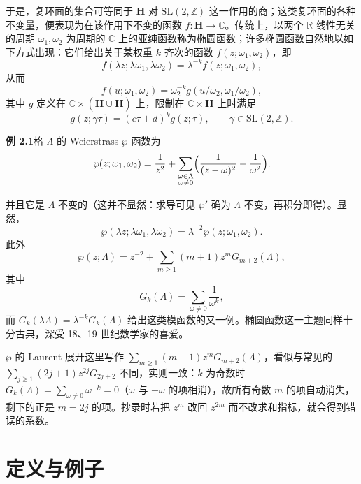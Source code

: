 于是，复环面的集合可等同于 $\mathbf{H}$ 对 $\mathrm{SL}(2,\mathbb{Z})$ 这一作用的商；这类复环面的各种不变量，便表现为在该作用下不变的函数 $f\colon\mathbf{H}\to\mathbb{C}$。传统上，以两个 $\mathbb{R}$ 线性无关的周期 $\omega_{1},\omega_{2}$ 为周期的 $\mathbb{C}$ 上的亚纯函数称为椭圆函数；许多椭圆函数自然地以如下方式出现：它们给出关于某权重 $k$ 齐次的函数 $f(z;\omega_{1},\omega_{2})$，即
\[
f(\lambda z;\lambda\omega_{1},\lambda\omega_{2})=\lambda^{-k}f(z;\omega_{1},\omega_{2}),
\]
从而
\[
f(u;\omega_{1},\omega_{2})=\omega_{2}^{-k}g(u/\omega_{2},\omega_{1}/\omega_{2}),
\]
其中 $g$ 定义在 $\mathbb{C}\times(\mathbf{H}\cup\overline{\mathbf{H}})$ 上，限制在 $\mathbb{C}\times\mathbf{H}$ 上时满足
\[
g(z;\gamma\tau)=(c\tau+d)^{k}g(z;\tau),\qquad\gamma\in\mathrm{SL}(2,\mathbb{Z}).
\]

\par\medskip\noindent\textbf{例 2.1}\quad 格 $\Lambda$ 的 Weierstrass $\wp$ 函数为
\[
\wp(z;\omega_{1},\omega_{2})=\frac{1}{z^{2}}+\sum_{\substack{\omega\in\Lambda\\ \omega\ne0}}\Bigl(\frac{1}{(z-\omega)^{2}}-\frac{1}{\omega^{2}}\Bigr).
\]

并且它是 $\Lambda$ 不变的（这并不显然：求导可见 $\wp'$ 确为 $\Lambda$ 不变，再积分即得）。显然，
\[
\wp(\lambda z;\lambda\omega_{1},\lambda\omega_{2})=\lambda^{-2}\wp(z;\omega_{1},\omega_{2}).
\]
此外
\[
\wp(z;\Lambda)=z^{-2}+\sum_{m\ge1}(m+1)z^{m}G_{m+2}(\Lambda),
\]
其中
\[
G_{k}(\Lambda)=\sum_{\omega\ne0}\frac{1}{\omega^{k}},
\]
而 $G_{k}(\lambda\Lambda)=\lambda^{-k}G_{k}(\Lambda)$ 给出这类模函数的又一例。椭圆函数这一主题同样十分古典，深受 18、19 世纪数学家的喜爱。

\begin{annote}
$\wp$ 的 Laurent 展开这里写作 $\sum_{m\ge1}(m+1)z^{m}G_{m+2}(\Lambda)$，看似与常见的 $\sum_{j\ge1}(2j+1)z^{2j}G_{2j+2}$ 不同，实则一致：$k$ 为奇数时 $G_{k}(\Lambda)=\sum_{\omega\ne0}\omega^{-k}=0$（$\omega$ 与 $-\omega$ 的项相消），故所有奇数 $m$ 的项自动消失，剩下的正是 $m=2j$ 的项。抄录时若把 $z^{m}$ 改回 $z^{2m}$ 而不改求和指标，就会得到错误的系数。
\par\vspace{0.15em}{\raggedleft 【来源：原书 §2.3（A）；Lang《Elliptic Functions》第 1--2 章（A）】\par}
\end{annote}

\section{定义与例子}\label{c3:sec:3}

